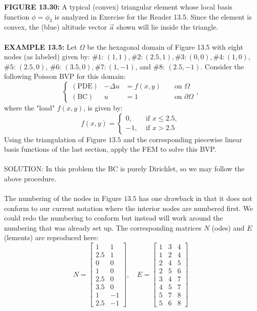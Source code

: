 \documentclass[../main.tex]{subfiles}
\begin{document}
\textbf{FIGURE 13.30:} A typical (convex) triangular element whose local basis function $\phi=\phi_{3}$ 
is analyzed in Exercise for the Reader 13.5. Since the element is convex, the (blue) altitude 
vector $\vec{a}$ shown will lie inside the triangle. 
\\
\\
\textbf{EXAMPLE 13.5:} Let $\Omega$ be the hexagonal domain of Figure 13.5 with eight nodes (as labeled) given by: $\#1$: $(1,1), \#2:(2.5,1), \#3:(0,0), \#4:(1,0)$, $\#5$:
$(2.5,0)$, $\#6$: $(3.5,0), \# 7:(1,-1)$, and $\#8$: $(2.5,-1)$. Consider the following Poisson BVP for this domain:
$$
\left\{\begin{array}{lrlrl}
(\mathrm{PDE}) & -\Delta u & =f(x, y) & & \text { on } \Omega \\
(\mathrm{BC}) & u & =1 & & \text { on } \partial \Omega
\end{array},\right.
$$
where the "load" $f(x, y)$, is given by:
$$
f(x, y)= \begin{cases}0, & \text { if } x \leq 2.5, \\ -1, & \text { if } x>2.5\end{cases}
$$
Using the triangulation of Figure $13.5$ and the corresponding piecewise linear basis functions of the last section, apply the FEM to solve this BVP.
\\
\\
SOLUTION: In this problem the BC is purely Dirichlet, so we may follow the above procedure.
\\
\\
The numbering of the nodes in Figure $13.5$ has one drawback in that it does not conform to our current notation where the interior nodes are numbered first. We could redo the numbering to conform but instead will work around the numbering that was already set up. The corresponding matrices $N$ (odes) and $E$ (lements) are reproduced here:
$$
N=\left[\begin{array}{cc}
1 & 1 \\
2.5 & 1 \\
0 & 0 \\
1 & 0 \\
2.5 & 0 \\
3.5 & 0 \\
1 & -1 \\
2.5 & -1
\end{array}\right], \quad E=\left[\begin{array}{lll}
1 & 3 & 4 \\
1 & 2 & 4 \\
2 & 4 & 5 \\
2 & 5 & 6 \\
3 & 4 & 7 \\
4 & 5 & 7 \\
5 & 7 & 8 \\
5 & 6 & 8
\end{array}\right]
$$
\end{document}
